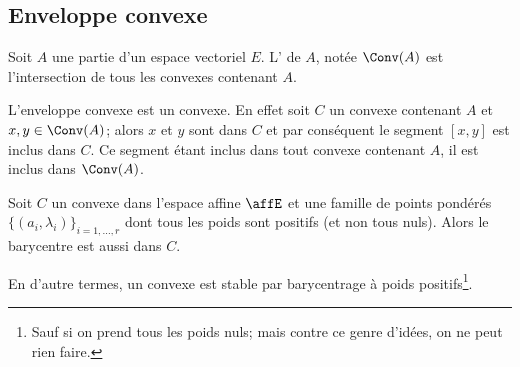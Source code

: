 \subsection{Enveloppe convexe}

\begin{definition}      \label{DefNLYYooXUHFUY}
    Soit \( A\) une partie d'un espace vectoriel \( E\). L' de \( A\), notée \( \Conv(A)\) est l'intersection de tous les convexes contenant \( A\).
\end{definition}
L'enveloppe convexe est un convexe. En effet soit \( C\) un convexe contenant \( A\) et \( x,y\in\Conv(A)\); alors \( x\) et \( y \) sont dans \( C\) et par conséquent le segment \( [x,y]\) est inclus dans \( C\). Ce segment étant inclus dans tout convexe contenant \( A\), il est inclus dans \( \Conv(A)\).

\begin{proposition} \label{PropSVvAQzi}
    Soit \( C\) un convexe dans l'espace affine \( \affE\) et une famille de points pondérés \( \{ (a_i,\lambda_i) \}_{i=1,\ldots, r}\) dont tous les poids sont positifs (et non tous nuls). Alors le barycentre est aussi dans \( C\).

    En d'autre termes, un convexe est stable par barycentrage à poids positifs\footnote{Sauf si on prend tous les poids nuls; mais contre ce genre d'idées, on ne peut rien faire.}.
\end{proposition}

